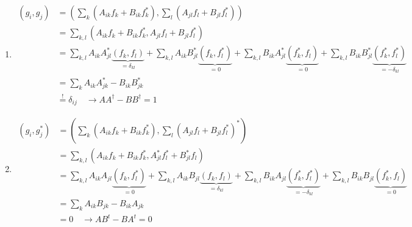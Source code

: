 \documentclass[10pt,a4paper]{article}
\theoremstyle{definition}
\begin{document}
\begin{enumerate}
\item
\begin{align}
(g_i,g_j)
&= \left(\sum_k ( A_{ik} f_k + B_{ik} f_k^*),\sum_l ( A_{jl} f_l + B_{jl} f_l^*)\right)\\
&= \sum_{k,l}\left( A_{ik} f_k + B_{ik} f_k^*, A_{jl} f_l + B_{jl} f_l^*\right)\\
&= \sum_{k,l}A_{ik}A^*_{jl}\underbrace{(f_k,f_l)}_{=\delta_{kl}}
+\sum_{k,l}A_{ik}B^*_{jl}\underbrace{(f_k,f_l^*)}_{=0}
+\sum_{k,l}B_{ik}A^*_{jl}\underbrace{(f_k^*,f_l)}_{=0}
+\sum_{k,l}B_{ik}B^*_{jl}\underbrace{(f_k^*,f_l^*)}_{=-\delta_{kl}}\\
&= \sum_{k}A_{ik}A^*_{jk}-B_{ik}B^*_{jk}\\
&\overset{!}{=}\delta_{ij}\quad\rightarrow AA^\dagger-BB^\dagger=1
\end{align}

\item
\begin{align}
(g_i,g^*_j)
&= \left(\sum_k ( A_{ik} f_k + B_{ik} f_k^*),\sum_l ( A_{jl} f_l + B_{jl} f_l^*)^*\right)\\
&= \sum_{k,l}\left( A_{ik} f_k + B_{ik} f_k^*, A^*_{jl} f^*_l + B^*_{jl} f_l\right)\\
&= \sum_{k,l}A_{ik}A_{jl}\underbrace{(f_k,f^*_l)}_{=0}
+\sum_{k,l}A_{ik}B_{jl}\underbrace{(f_k,f_l)}_{=\delta_{kl}}
+\sum_{k,l}B_{ik}A_{jl}\underbrace{(f_k^*,f_l^*)}_{=-\delta_{kl}}
+\sum_{k,l}B_{ik}B_{jl}\underbrace{(f_k^*,f_l)}_{=0}\\
&= \sum_{k}A_{ik}B_{jk}-B_{ik}A_{jk}\\
&=0\quad\rightarrow AB^t-BA^t=0
\end{align}


\end{enumerate}
\end{document}
